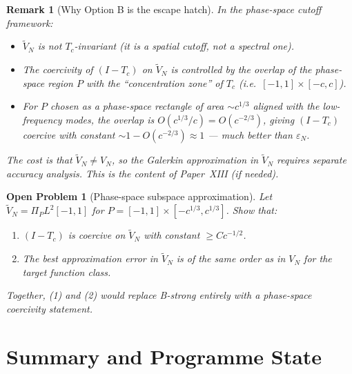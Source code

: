 \documentclass[12pt,a4paper]{article}
\newtheorem{remark}[theorem]{Remark}
\newtheorem{openproblem}[theorem]{Open Problem}
\newcommand{\Tc}{T_c}
\newcommand{\VN}{V_N}
\begin{document}
\begin{remark}[Why Option B is the escape hatch]
In the phase-space cutoff framework:
\begin{itemize}[nosep]
  \item $\widetilde{V}_N$ is \emph{not} $\Tc$-invariant
        (it is a spatial cutoff, not a spectral one).
  \item The coercivity of $(I-\Tc)$ on $\widetilde{V}_N$
        is controlled by the \emph{overlap} of the
        phase-space region $P$ with the
        ``concentration zone'' of $\Tc$
        (i.e.\ $[-1,1] \times [-c,c]$).
  \item For $P$ chosen as a phase-space rectangle
        of area $\sim c^{1/3}$ aligned with the
        low-frequency modes, the overlap is
        $O(c^{1/3}/c) = O(c^{-2/3})$,
        giving $(I-\Tc)$ coercive with constant
        $\sim 1 - O(c^{-2/3}) \approx 1$
        --- much better than $\varepsilon_N$.
\end{itemize}
The cost is that $\widetilde{V}_N \neq \VN$,
so the Galerkin approximation in $\widetilde{V}_N$
requires separate accuracy analysis.
This is the content of Paper~XIII (if needed).
\end{remark}

\begin{openproblem}[Phase-space subspace approximation]
\label{op:phasespace_approx}
Let $\widetilde{V}_N = \Pi_P L^2[-1,1]$ for
$P = [-1,1] \times [-c^{1/3}, c^{1/3}]$.
Show that:
\begin{enumerate}[nosep]
  \item $(I-\Tc)$ is coercive on $\widetilde{V}_N$
        with constant $\geq Cc^{-1/2}$.
  \item The best approximation error in
        $\widetilde{V}_N$ is of the same order
        as in $\VN$ for the target function class.
\end{enumerate}
Together, (1) and (2) would replace B-strong
entirely with a phase-space coercivity statement.
\end{openproblem}

\section{Summary and Programme State}
\label{sec:summary}
\end{document}
